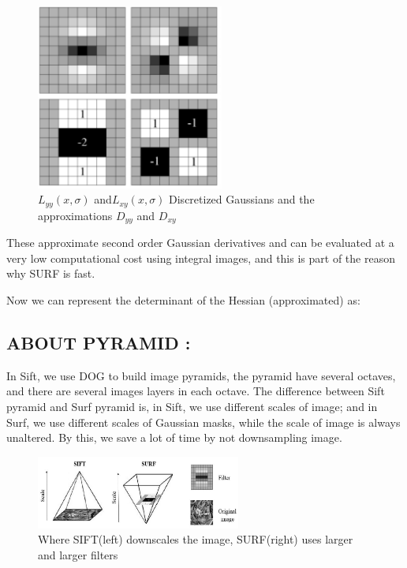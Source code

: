 \begin{figure}[H]
\centering
\includegraphics[width=0.55\textwidth]{img/surf4.PNG}
\caption{${L_{yy}(x,\sigma)}$ and${L_{xy}(x,\sigma)}$ Discretized
Gaussians and the approximations $D_{yy}$ and $D_{xy}$}
\label{fig:surf1}
\end{figure}

These approximate second order Gaussian derivatives and can be evaluated at a very low computational cost using integral images, and this is part of the reason why SURF is fast.

Now we can represent the determinant of the Hessian (approximated) as:



\subsection{ABOUT PYRAMID :}

In Sift, we use DOG to build image pyramids, the pyramid have several octaves, and there are several images layers in each octave. The difference between Sift pyramid and Surf pyramid is, in Sift, we use different scales of image; and in Surf, we use different scales of Gaussian masks, while the scale of image is always unaltered. By this, we save a lot of time by not downsampling image.

\begin{figure}[H]
\centering
\includegraphics[width=0.6\textwidth]{img/surf2.png}
\caption{Where SIFT(left) downscales the image,
SURF(right) uses larger and larger filters}
\label{fig:surf2}
\end{figure}

